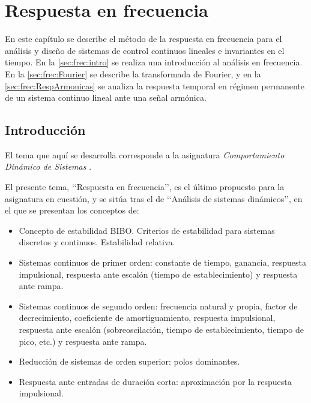 
\chapter{Respuesta en frecuencia}

\begin{Resumen}

En este capítulo se describe el método de la respuesta en frecuencia para el análisis y diseño de sistemas de control continuos lineales e invariantes en el tiempo. En la \autoref{sec:frec:intro} se realiza una introducción al análisis en frecuencia. En la \autoref{sec:frec:Fourier} se describe la transformada de Fourier, y en la  \autoref{sec:frec:RespArmonicas} se analiza la respuesta temporal en régimen permanente de un sistema continuo lineal ante una señal armónica.

\end{Resumen}

\section{Introducción}
\label{sec:frec:intro}

El tema que aquí se desarrolla corresponde a la asignatura \textsl{Comportamiento Dinámico de
Sistemas} \parencite{sala00,Blasco01}.

El presente tema, \lq\lq Respuesta en frecuencia\rq\rq, es el último propuesto para la
asignatura en cuestión, y se sitúa tras el de \lq\lq Análisis de sistemas dinámicos\rq\rq, en
el que se presentan los conceptos de:

\begin{itemize}

	\item Concepto de estabilidad BIBO. Criterios de estabilidad para sistemas discretos y
	continuos. Estabilidad relativa.
	
	\item Sistemas continuos de primer orden: constante de tiempo, ganancia, respuesta impulsional,
	respuesta ante escalón (tiempo de establecimiento) y respuesta ante rampa.

	\item Sistemas continuos de segundo orden: frecuencia natural y propia, factor de
	decrecimiento, coeficiente de amortiguamiento, respuesta impulsional, respuesta ante escalón
	(sobreoscilación, tiempo de establecimiento, tiempo de pico, etc.) y respuesta ante rampa.

	\item Reducción de sistemas de orden superior: polos dominantes.

	\item Respuesta ante entradas de duración corta: aproximación por la respuesta impulsional.

\end{itemize}

